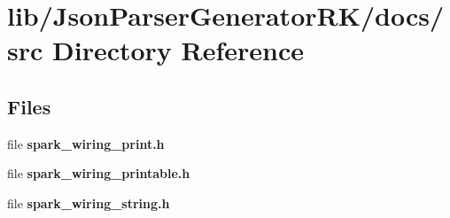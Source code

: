 \section{lib/\+Json\+Parser\+Generator\+R\+K/docs/src Directory Reference}
\label{dir_7ae30a857ba9b309f9c81c743feb0b8d}
\subsection*{Files}
\begin{DoxyCompactItemize}
\item 
file \textbf{ spark\+\_\+wiring\+\_\+print.\+h}
\item 
file \textbf{ spark\+\_\+wiring\+\_\+printable.\+h}
\item 
file \textbf{ spark\+\_\+wiring\+\_\+string.\+h}
\end{DoxyCompactItemize}
